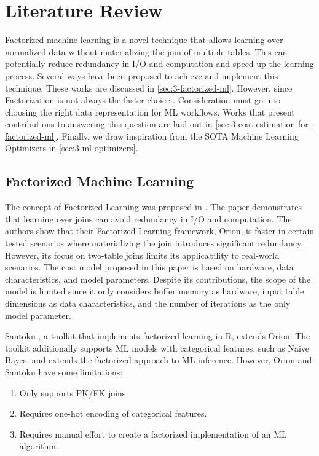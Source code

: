 
\chapter{Literature Review}
\label{chapter:literature}

Factorized machine learning is a novel technique that allows learning over normalized data without materializing the join of multiple tables. This can potentially reduce redundancy in I/O and computation and speed up the learning process. Several ways have been proposed to achieve and implement this technique. These works are discussed in \autoref{sec:3-factorized-ml}. However, since Factorization is not always the faster choice \cite{orion_learning_gen_lin_models, morpheus, amalur,amalur_tkde24}. Consideration must go into choosing the right data representation for ML workflows. Works that present contributions to answering this question are laid out in \autoref{sec:3-cost-estimation-for-factorized-ml}. Finally, we draw inspiration from the SOTA Machine Learning Optimizers in \autoref{sec:3-ml-optimizers}.

\section{Factorized Machine Learning}
\label{sec:3-factorized-ml}
The concept of Factorized Learning was proposed in \cite{orion_learning_gen_lin_models}. The paper demonstrates that learning over joins can avoid redundancy in I/O and computation. The authors show that their Factorized Learning framework, Orion, is faster in certain tested scenarios where materializing the join introduces significant redundancy. However, its focus on two-table joins limits its applicability to real-world scenarios. The cost model proposed in this paper is based on hardware, data characteristics, and model parameters. Despite its contributions, the scope of the model is limited since it only considers buffer memory as hardware, input table dimensions as data characteristics, and the number of iterations as the only model parameter.

Santoku \cite{santoku_kumar_demonstration_2015}, a toolkit that implements factorized learning in R, extends Orion. The toolkit additionally supports ML models with categorical features, such as Naive Bayes, and extends the factorized approach to ML inference. However, Orion and Santoku have some limitations:

\begin{enumerate}
  \item Only supports PK/FK joins.
  \item Requires one-hot encoding of categorical features.
  \item Requires manual effort to create a factorized implementation of an ML algorithm.
\end{enumerate}

